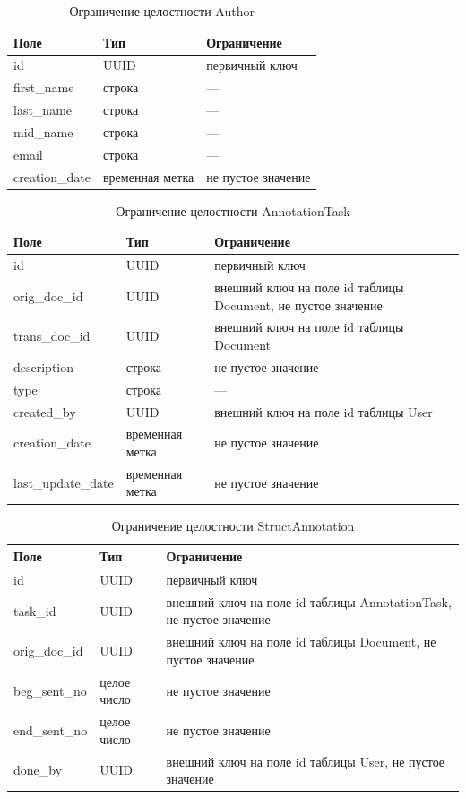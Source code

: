 \begin{table}[H]
\centering
\caption{Ограничение целостности Author}
\begin{tabular}{|m{3cm}|m{3cm}|m{6cm}|}
\hline
\textbf{Поле} & \textbf{Тип} & \textbf{Ограничение} \\ \hline
id & UUID & первичный ключ \\ \hline
first\_name & строка & --- \\ \hline
last\_name & строка & --- \\ \hline
mid\_name & строка & --- \\ \hline
email & строка & --- \\ \hline
creation\_date & временная метка & не пустое значение \\ \hline
\end{tabular}
\end{table}

\begin{table}[H]
\centering
\caption{Ограничение целостности AnnotationTask}
\begin{tabular}{|m{4cm}|m{3cm}|m{6cm}|}
\hline
\textbf{Поле} & \textbf{Тип} & \textbf{Ограничение} \\ \hline
id & UUID & первичный ключ \\ \hline
orig\_doc\_id & UUID & внешний ключ на поле id таблицы Document, не пустое значение \\ \hline
trans\_doc\_id & UUID & внешний ключ на поле id таблицы Document \\ \hline
description & строка & не пустое значение \\ \hline
type & строка & --- \\ \hline
created\_by & UUID & внешний ключ на поле id таблицы User \\ \hline
creation\_date & временная метка & не пустое значение \\ \hline
last\_update\_date & временная метка & не пустое значение \\ \hline
\end{tabular}
\end{table}

\begin{table}[H]
\centering
\caption{Ограничение целостности StructAnnotation}
\begin{tabular}{|m{3cm}|m{3cm}|m{6cm}|}
\hline
\textbf{Поле} & \textbf{Тип} & \textbf{Ограничение} \\ \hline
id & UUID & первичный ключ \\ \hline
task\_id & UUID & внешний ключ на поле id таблицы AnnotationTask, не пустое значение \\ \hline
orig\_doc\_id & UUID & внешний ключ на поле id таблицы Document, не пустое значение \\ \hline
beg\_sent\_no & целое число & не пустое значение \\ \hline
end\_sent\_no & целое число & не пустое значение \\ \hline
done\_by & UUID & внешний ключ на поле id таблицы User, не пустое значение \\ \hline
\end{tabular}
\end{table}


